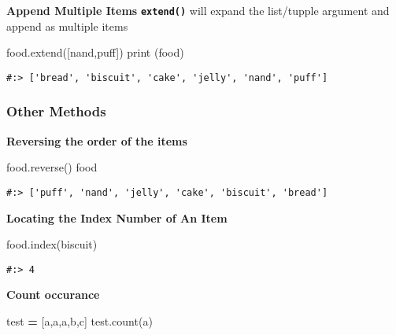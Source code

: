 \documentclass[
]{book}
\newenvironment{Shaded}{\begin{snugshade}}{\end{snugshade}}
\newcommand{\BuiltInTok}[1]{#1}
\newcommand{\NormalTok}[1]{#1}
\newcommand{\OperatorTok}[1]{\textcolor[rgb]{0.43,0.43,0.43}{\textbf{#1}}}
\newcommand{\StringTok}[1]{\textcolor[rgb]{0.5,0.5,0.5}{#1}}
\begin{document}
\textbf{Append Multiple Items} \textbf{\texttt{extend()}} will expand the list/tupple argument and append as multiple items

\begin{Shaded}
\begin{Highlighting}[]
\NormalTok{food.extend([}\StringTok{\textquotesingle{}nand\textquotesingle{}}\NormalTok{,}\StringTok{\textquotesingle{}puff\textquotesingle{}}\NormalTok{])}
\BuiltInTok{print}\NormalTok{ (food)}
\end{Highlighting}
\end{Shaded}

\begin{verbatim}
#:> ['bread', 'biscuit', 'cake', 'jelly', 'nand', 'puff']
\end{verbatim}

\hypertarget{other-methods}{%
\subsubsection{Other Methods}\label{other-methods}}

\textbf{Reversing the order of the items}

\begin{Shaded}
\begin{Highlighting}[]
\NormalTok{food.reverse()}
\NormalTok{food}
\end{Highlighting}
\end{Shaded}

\begin{verbatim}
#:> ['puff', 'nand', 'jelly', 'cake', 'biscuit', 'bread']
\end{verbatim}

\textbf{Locating the Index Number of An Item}

\begin{Shaded}
\begin{Highlighting}[]
\NormalTok{food.index(}\StringTok{\textquotesingle{}biscuit\textquotesingle{}}\NormalTok{)}
\end{Highlighting}
\end{Shaded}

\begin{verbatim}
#:> 4
\end{verbatim}

\textbf{Count occurance}

\begin{Shaded}
\begin{Highlighting}[]
\NormalTok{test }\OperatorTok{=}\NormalTok{ [}\StringTok{\textquotesingle{}a\textquotesingle{}}\NormalTok{,}\StringTok{\textquotesingle{}a\textquotesingle{}}\NormalTok{,}\StringTok{\textquotesingle{}a\textquotesingle{}}\NormalTok{,}\StringTok{\textquotesingle{}b\textquotesingle{}}\NormalTok{,}\StringTok{\textquotesingle{}c\textquotesingle{}}\NormalTok{]}
\NormalTok{test.count(}\StringTok{\textquotesingle{}a\textquotesingle{}}\NormalTok{)}
\end{Highlighting}
\end{Shaded}
\end{document}
